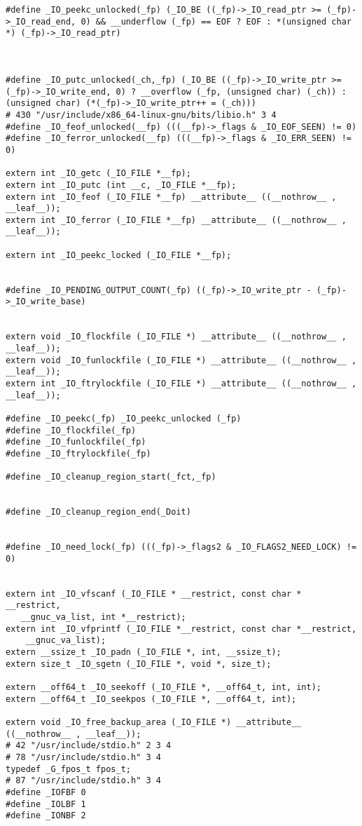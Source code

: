\documentclass[11pt]{article}
\begin{document}
\begin{enumerate}
\begin{verbatim}
#define _IO_peekc_unlocked(_fp) (_IO_BE ((_fp)->_IO_read_ptr >= (_fp)->_IO_read_end, 0) && __underflow (_fp) == EOF ? EOF : *(unsigned char *) (_fp)->_IO_read_ptr)



#define _IO_putc_unlocked(_ch,_fp) (_IO_BE ((_fp)->_IO_write_ptr >= (_fp)->_IO_write_end, 0) ? __overflow (_fp, (unsigned char) (_ch)) : (unsigned char) (*(_fp)->_IO_write_ptr++ = (_ch)))
# 430 "/usr/include/x86_64-linux-gnu/bits/libio.h" 3 4
#define _IO_feof_unlocked(__fp) (((__fp)->_flags & _IO_EOF_SEEN) != 0)
#define _IO_ferror_unlocked(__fp) (((__fp)->_flags & _IO_ERR_SEEN) != 0)

extern int _IO_getc (_IO_FILE *__fp);
extern int _IO_putc (int __c, _IO_FILE *__fp);
extern int _IO_feof (_IO_FILE *__fp) __attribute__ ((__nothrow__ , __leaf__));
extern int _IO_ferror (_IO_FILE *__fp) __attribute__ ((__nothrow__ , __leaf__));

extern int _IO_peekc_locked (_IO_FILE *__fp);


#define _IO_PENDING_OUTPUT_COUNT(_fp) ((_fp)->_IO_write_ptr - (_fp)->_IO_write_base)


extern void _IO_flockfile (_IO_FILE *) __attribute__ ((__nothrow__ , __leaf__));
extern void _IO_funlockfile (_IO_FILE *) __attribute__ ((__nothrow__ , __leaf__));
extern int _IO_ftrylockfile (_IO_FILE *) __attribute__ ((__nothrow__ , __leaf__));

#define _IO_peekc(_fp) _IO_peekc_unlocked (_fp)
#define _IO_flockfile(_fp) 
#define _IO_funlockfile(_fp) 
#define _IO_ftrylockfile(_fp) 

#define _IO_cleanup_region_start(_fct,_fp) 


#define _IO_cleanup_region_end(_Doit) 


#define _IO_need_lock(_fp) (((_fp)->_flags2 & _IO_FLAGS2_NEED_LOCK) != 0)


extern int _IO_vfscanf (_IO_FILE * __restrict, const char * __restrict,
   __gnuc_va_list, int *__restrict);
extern int _IO_vfprintf (_IO_FILE *__restrict, const char *__restrict,
    __gnuc_va_list);
extern __ssize_t _IO_padn (_IO_FILE *, int, __ssize_t);
extern size_t _IO_sgetn (_IO_FILE *, void *, size_t);

extern __off64_t _IO_seekoff (_IO_FILE *, __off64_t, int, int);
extern __off64_t _IO_seekpos (_IO_FILE *, __off64_t, int);

extern void _IO_free_backup_area (_IO_FILE *) __attribute__ ((__nothrow__ , __leaf__));
# 42 "/usr/include/stdio.h" 2 3 4
# 78 "/usr/include/stdio.h" 3 4
typedef _G_fpos_t fpos_t;
# 87 "/usr/include/stdio.h" 3 4
#define _IOFBF 0
#define _IOLBF 1
#define _IONBF 2





\end{verbatim}
\end{enumerate}
\end{document}

